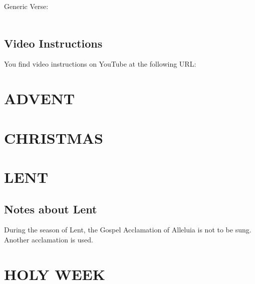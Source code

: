 \documentclass[11pt]{book} %
\begin{document}

\begin{paragraph}\noindent\begin{large}
Generic Verse:\\\\
\end{large}\end{paragraph}

\section{Video Instructions}
\begin{paragraph}
You find video instructions on YouTube at the following URL:
\end{paragraph}

\chapter{ADVENT}




\chapter{CHRISTMAS}



\chapter{LENT}
\section{Notes about Lent}
\begin{paragraph}
During the season of Lent, the Gospel Acclamation of Alleluia is
not to be sung. Another acclamation is used.
\end{paragraph}



\chapter{HOLY WEEK}
\end{document}
